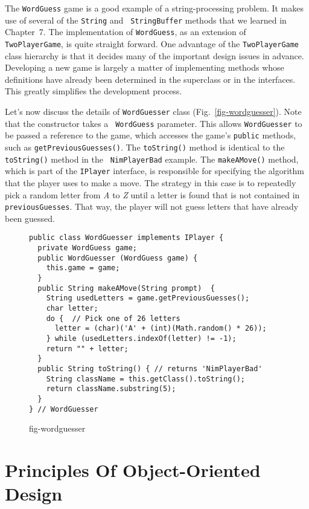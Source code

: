 The {\tt WordGuess} game is a good example of a string-processing
problem.  It makes use of several of the {\tt String} and {\tt
StringBuffer} methods that we learned in Chapter~7.  The
implementation of {\tt WordGuess}, as an extension of {\tt
TwoPlayerGame}, is quite straight forward. One advantage of
the {\tt TwoPlayerGame} class hierarchy is that it decides many
of the important design issues in advance. Developing a new game
is largely a matter of implementing methods whose definitions have
already been determined in the superclass or in the interfaces.  This
greatly simplifies the development process.

Let's now discuss the details of {\tt WordGuesser} class
(Fig.~\ref{fig-wordguesser}). Note that the constructor takes a {\tt
WordGuess} parameter. This allows {\tt WordGuesser} to be passed a
reference to the game, which accesses the game's {\tt public}
methods, such as {\tt getPreviousGuesses()}.  The {\tt toString()}
method is identical to the {\tt toString()} method in the {\tt
NimPlayerBad} example.  The {\tt makeAMove()} method, which is part of
the {\tt IPlayer} interface, is responsible for specifying the
algorithm that the player uses to make a move.  The strategy in this
case is to repeatedly pick a random letter from {\em A} to {\em Z}
until a letter is found that is not contained in {\tt
previousGuesses}.  That way, the player will not guess letters that
have already been guessed. 

\begin{figure}[t]
\jjjprogstart
\begin{jjjlisting}
\begin{lstlisting}
public class WordGuesser implements IPlayer {   
  private WordGuess game;
  public WordGuesser (WordGuess game) {   
    this.game = game;
  }
  public String makeAMove(String prompt)  {   
    String usedLetters = game.getPreviousGuesses();
    char letter;
    do {  // Pick one of 26 letters
      letter = (char)('A' + (int)(Math.random() * 26));
    } while (usedLetters.indexOf(letter) != -1);
    return "" + letter;
  }
  public String toString() { // returns 'NimPlayerBad'
    String className = this.getClass().toString(); 
    return className.substring(5);        
  }
} // WordGuesser
\end{lstlisting}
\end{jjjlisting}
{fig-wordguesser}
\end{figure}

\section{Principles Of Object-Oriented Design}


